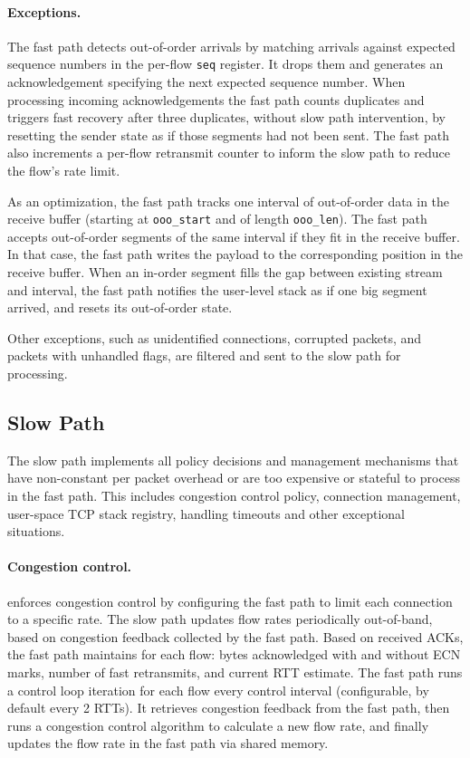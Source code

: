 \paragraph{Exceptions.} The fast path detects out-of-order arrivals by
matching arrivals against expected sequence numbers in the per-flow
\verb+seq+ register. It drops them and generates an acknowledgement
specifying the next expected sequence number.  When processing
incoming acknowledgements the fast path counts duplicates and triggers
fast recovery after three duplicates, without slow path intervention,
by resetting the sender state as if those segments had not been
sent. The fast path also increments a per-flow retransmit counter to
inform the slow path to reduce the flow's rate limit.

As an optimization, the fast path tracks one interval of out-of-order
data in the receive buffer (starting at \verb+ooo_start+ and of length
\verb+ooo_len+).  The fast path accepts out-of-order segments of the
same interval if they fit in the receive buffer. In that case, the
fast path writes the payload to the corresponding position in the
receive buffer.  When an in-order segment fills the gap between
existing stream and interval, the fast path notifies the user-level
stack as if one big segment arrived, and resets its out-of-order
state.

Other exceptions, such as unidentified connections, corrupted packets,
and packets with unhandled flags, are filtered and sent to the
slow path for processing.

\subsection{Slow Path}

The slow path implements all policy decisions and management
mechanisms that have non-constant per packet overhead or are too
expensive or stateful to process in the fast path. This includes
congestion control policy, connection management, user-space TCP stack
registry, handling timeouts and other exceptional situations.

\paragraph{Congestion control.} \softtcp enforces congestion control
by configuring the fast path to limit each connection to a specific
rate.  The slow path updates flow rates periodically out-of-band,
based on congestion feedback collected by the fast path.  Based on
received ACKs, the fast path maintains for each flow: bytes
acknowledged with and without ECN marks, number of fast retransmits,
and current RTT estimate.  The fast path runs a control loop iteration
for each flow every control interval (configurable, by default every 2
RTTs).  It retrieves congestion feedback from the fast path, then runs
a congestion control algorithm to calculate a new flow rate, and
finally updates the flow rate in the fast path via shared memory.


